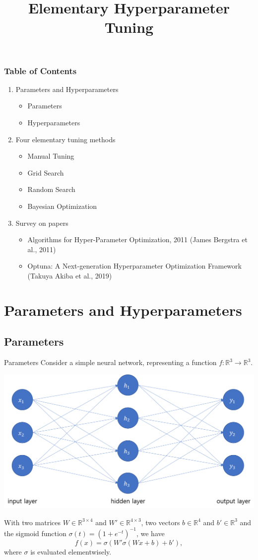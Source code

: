 \documentclass{beamer}
\title{Elementary Hyperparameter Tuning}
\begin{document}
%
\frame{\titlepage}

%
\begin{frame}
\frametitle{Table of Contents}
\begin{enumerate}[1.]
\item
Parameters and Hyperparameters
\begin{itemize}
\item
Parameters
\item
Hyperparameters
\end{itemize}
\item
Four elementary tuning methods
\begin{itemize}
\item
Manual Tuning
\item
Grid Search
\item
Random Search
\item
Bayesian Optimization
\end{itemize}
\item
Survey on papers
\begin{itemize}
\item
Algorithms for Hyper-Parameter Optimization, 2011 (James Bergstra et al., 2011)
\item
Optuna: A Next-generation Hyperparameter Optimization Framework (Takuya Akiba et al., 2019)
\end{itemize}
\end{enumerate}
\end{frame}

\section{Parameters and Hyperparameters}

\subsection{Parameters}

%
\begin{frame}{Parameters}
Consider a simple neural network, representing  a function \(f:\mathbb R^3\to\mathbb R^3\).
\begin{center}
\includegraphics[width=.5\textwidth]{1_1_mlp}
\end{center}
With two matrices \(W\in\mathbb R^{3\times 4}\) and \(W'\in\mathbb R^{4\times 3}\), two vectors \(b\in\mathbb R^4\) and \(b'\in\mathbb R^3\) and the sigmoid function \(\sigma(t)=(1+e^{-t})^{-1}\), we have
\begin{equation}\label{f}
f(x)=\sigma(W'\sigma(Wx+b)+b'),
\end{equation}
where \(\sigma\) is evaluated elementwisely.
\end{frame}
\end{document}

